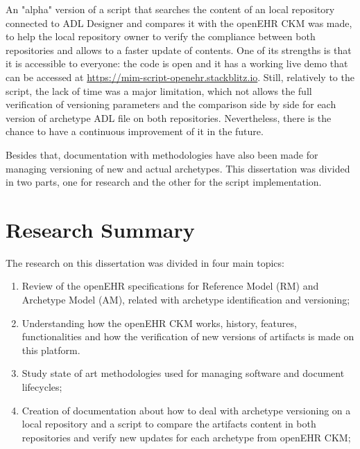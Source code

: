 \documentclass[mim_thesis.tex]{subfiles}
\begin{document}
An "alpha" version of a script that searches the content of an local repository connected to ADL Designer and compares it with the openEHR CKM was made, to help the local repository owner to verify the compliance between both repositories and allows to a faster update of contents. One of its strengths is that it is accessible to everyone: the code is open and it has a working live demo that can be accessed at \url{https://mim-script-openehr.stackblitz.io}. Still, relatively to the script, the lack of time was a major limitation, which not allows the full verification of versioning parameters and the comparison side by side for each version of archetype ADL file on both repositories. Nevertheless, there is the chance to have a continuous improvement of it in the future. 

Besides that, documentation with methodologies have also been made for managing versioning of new and actual archetypes. This dissertation was divided in two parts, one for research and the other for the script implementation. 



\section{Research Summary}

The research on this dissertation was divided in four main topics: 
\begin{enumerate}[noitemsep]
\item  Review of the openEHR specifications for Reference Model (RM) and 
Archetype Model (AM), related with archetype identification and versioning; 

\item Understanding how the openEHR CKM works, history, features, functionalities and how the verification of new versions of artifacts is made on this platform.

\item Study state of art methodologies used for managing software and document lifecycles;

\item Creation of documentation about how to deal with archetype versioning on a local repository and a script to compare the artifacts content in both repositories and verify new updates for each archetype from openEHR CKM; 

\end{enumerate}
\end{document}
